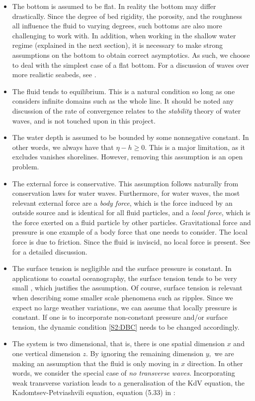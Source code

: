 \begin{itemize}
\item The bottom is assumed to be flat. In reality the bottom may differ drastically. Since the degree of bed rigidity, the porosity, and the roughness all influence the fluid to varying degrees, such bottoms are also more challenging to work with. In addition, when working in the shallow water regime (explained in the next section), it is necessary to make strong assumptions on the bottom to obtain correct asymptotics. As such, we choose to deal with the simplest case of a flat bottom. For a discussion of waves over more realistic seabeds, see \cite[Chapter 9]{DD}.
\item The fluid tends to equilibrium. This is a natural condition so long as one considers infinite domains such as the whole line. It should be noted any discussion of the rate of convergence relates to the \textit{stability} theory of water waves, and is not touched upon in this project.
\item The water depth is assumed to be bounded by some nonnegative constant. In other words, we always have that $\eta - h \geq 0.$ This is a major limitation, as it excludes vanishes shorelines. However, removing this assumption is an open problem.
\item The external force is conservative. This assumption follows naturally from conservation laws for water waves. Furthermore, for water waves, the most relevant external force are a \textit{body force}, which is the force induced by an outside source and is identical for all fluid particles, and a \textit{local force}, which is the force exerted on a fluid particle by other particles. Gravitational force and pressure is one example of a body force that one needs to consider. The local force is due to friction. Since the fluid is inviscid, no local force is present. See \cite[Chapter 4]{CK} for a detailed discussion.
\item The surface tension is negligible and the surface pressure is constant. In applications to coastal oceanography, the surface tension tends to be very small \cite{?}, which justifies the assumption. Of course, surface tension is relevant when describing some smaller scale phenomena such as ripples. Since we expect no large weather variations, we can assume that locally pressure is constant. If one is to incorporate non-constant pressure and/or surface tension, the dynamic condition \eqref{S2:DBC} needs to be changed accordingly.
\item The system is two dimensional, that is, there is one spatial dimension $x$ and one vertical dimension $z.$ By ignoring the remaining dimension $y,$ we are making an assumption that the fluid is only moving in $x$ direction. In other words, we consider the special case of \textit{no transverse waves}.  Incorporating weak transverse variation leads to a generalisation of the KdV equation, the Kadomtsev-Petviashvili equation, equation (5.33) in \cite[Chapter 5]{Ablowitz}:

\end{itemize}
